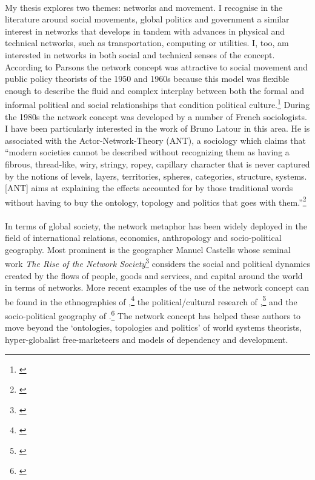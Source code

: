 \documentclass[11pt,titlepage]{book}
\begin{document}
\paragraph{}My thesis explores two themes: networks and movement. I recognise in the literature around social movements, global politics and government a similar interest in networks that develops in tandem with advances in physical and technical networks, such as transportation, computing or utilities. I, too, am interested in networks in both social and technical senses of the concept. According to Parsons the network concept was attractive to social movement and public policy theorists of the 1950 and 1960s because this model was flexible enough to describe the fluid and complex interplay between both the formal and informal political and social relationships that condition political culture.\footnote{\cite{parsons:1995}} During the 1980s the network concept was developed by a number of French sociologists. I have been particularly interested in the work of Bruno Latour in this area. He is associated with the Actor-Network-Theory (ANT), a sociology which claims that ``modern societies cannot be described without recognizing them as having a fibrous, thread-like, wiry, stringy, ropey, capillary character that is never captured by the notions of levels, layers, territories, spheres, categories, structure, systems. [ANT] aims at explaining the effects accounted for by those traditional words without having to buy the ontology, topology and politics that goes with them.''\footnote{\cite{latour:1998ant1}}

\paragraph{}In terms of global society, the network metaphor has been widely deployed in the field of international relations, economics, anthropology and socio-political geography. Most prominent is the geographer Manuel Castells whose seminal work \textit{The Rise of the Network Society}\footnote{\cite{Castells:1996ns}} considers the social and political dynamics created by the flows of people, goods and services, and capital around the world in terms of networks. More recent examples of the use of the network concept can be found in the ethnographies of ,\footnote{\cite{Appadurai:1996lp}} the political/cultural research of ,\footnote{\cite{Terranova:2004ly}} and the socio-political geography of .\footnote{\cite{Barry:2001ff}} The network concept has helped these authors to move beyond the `ontologies, topologies and politics' of world systems theorists, hyper-globalist free-marketeers and models of dependency and development.
\end{document}
